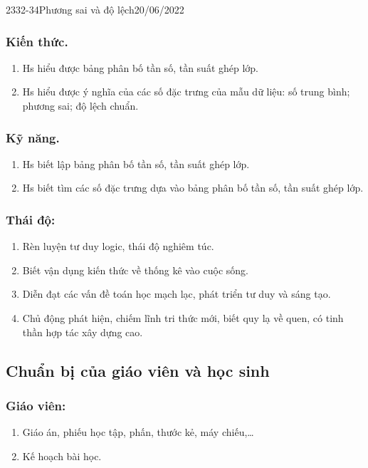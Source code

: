 \setcounter{section}{3}
\begin{tieude}
{23}{32-34}{Phương sai và độ lệch}{20/06/2022}
\end{tieude}
\subsubsection{Kiến thức.}
\begin{enumerate}
\item Hs hiểu được bảng phân bố tần số, tần suất ghép lớp.
\item Hs hiểu được ý nghĩa của các số đặc trưng của mẫu dữ liệu: số trung bình; phương sai; độ lệch chuẩn.
\end{enumerate}
\subsubsection{Kỹ năng.}
\begin{enumerate}
\item Hs biết lập bảng phân bố tần số, tần suất ghép lớp.
\item Hs biết tìm các số đặc trưng dựa vào bảng phân bố tần số, tần suất ghép lớp.
\end{enumerate}
\subsubsection{Thái độ:}
\begin{enumerate}
	\item Rèn luyện tư duy logic, thái độ nghiêm túc.
	\item Biết vận dụng kiến thức về thống kê vào cuộc sống.
	\item Diễn đạt các vấn đề toán học mạch lạc, phát triển tư duy và sáng tạo.
	\item Chủ động phát hiện, chiếm lĩnh tri thức mới, biết quy lạ về quen, có tinh thần hợp tác xây dựng cao.
\end{enumerate}
\subsection{Chuẩn bị của giáo viên và học sinh}
\subsubsection{Giáo viên:} 
\begin{enumerate}
	\item Giáo án, phiếu học tập, phấn, thước kẻ, máy chiếu,\ldots
	\item Kế hoạch bài học.
\end{enumerate}
